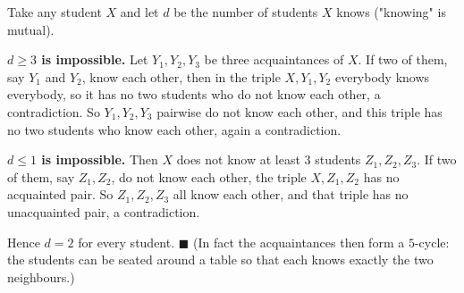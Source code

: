 Take any student $X$ and let $d$ be the number of students $X$ knows ("knowing" is mutual).

\textbf{$d\ge3$ is impossible.} Let $Y_1,Y_2,Y_3$ be three acquaintances of $X$. If two of them, say $Y_1$ and $Y_2$, know each other, then in the triple $X,Y_1,Y_2$ everybody knows everybody, so it has no two students who do not know each other, a contradiction. So $Y_1,Y_2,Y_3$ pairwise do not know each other, and this triple has no two students who know each other, again a contradiction.

\textbf{$d\le1$ is impossible.} Then $X$ does not know at least $3$ students $Z_1,Z_2,Z_3$. If two of them, say $Z_1,Z_2$, do not know each other, the triple $X,Z_1,Z_2$ has no acquainted pair. So $Z_1,Z_2,Z_3$ all know each other, and that triple has no unacquainted pair, a contradiction.

Hence $d=2$ for every student. $\blacksquare$ (In fact the acquaintances then form a $5$-cycle: the students can be seated around a table so that each knows exactly the two neighbours.)
